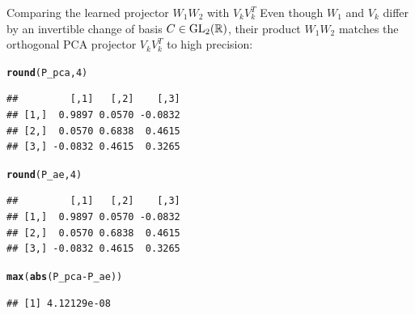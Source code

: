 \documentclass[aspectratio=169]{beamer}\usepackage[]{graphicx}\usepackage[]{xcolor}
\makeatletter
\newcommand{\hlnum}[1]{\textcolor[rgb]{0.686,0.059,0.569}{#1}}%
\newcommand{\hlopt}[1]{\textcolor[rgb]{0,0,0}{#1}}%
\newcommand{\hldef}[1]{\textcolor[rgb]{0.345,0.345,0.345}{#1}}%
\newcommand{\hlkwd}[1]{\textcolor[rgb]{0.737,0.353,0.396}{\textbf{#1}}}%
\newenvironment{kframe}{%
 \def\at@end@of@kframe{}%
 \ifinner\ifhmode%
  \def\at@end@of@kframe{\end{minipage}}%
  \begin{minipage}{\columnwidth}%
 \fi\fi%
 \def\FrameCommand##1{\hskip\@totalleftmargin \hskip-\fboxsep
 \colorbox{shadecolor}{##1}\hskip-\fboxsep
     \hskip-\linewidth \hskip-\@totalleftmargin \hskip\columnwidth}%
 \MakeFramed {\advance\hsize-\width
   \@totalleftmargin\z@ \linewidth\hsize
   \@setminipage}}%
 {\par\unskip\endMakeFramed%
 \at@end@of@kframe}
\newenvironment{knitrout}{}{} %
\makeatother
\begin{document}
\begin{frame}[fragile]{Comparing the learned projector $W_1 W_2$ with $V_k V_k^T$}
Even though $W_1$ and $V_k$ differ by an invertible change of basis $C \in \operatorname{GL}_2(\mathbb{R})$, their product $W_1 W_2$ matches the orthogonal PCA projector $V_k V_k^T$ to high precision:
\begin{knitrout}
\color{fgcolor}\begin{kframe}
\begin{alltt}
\hlkwd{round}\hldef{(P_pca,} \hlnum{4}\hldef{)}
\end{alltt}
\begin{verbatim}
##         [,1]   [,2]    [,3]
## [1,]  0.9897 0.0570 -0.0832
## [2,]  0.0570 0.6838  0.4615
## [3,] -0.0832 0.4615  0.3265
\end{verbatim}
\begin{alltt}
\hlkwd{round}\hldef{(P_ae,} \hlnum{4}\hldef{)}
\end{alltt}
\begin{verbatim}
##         [,1]   [,2]    [,3]
## [1,]  0.9897 0.0570 -0.0832
## [2,]  0.0570 0.6838  0.4615
## [3,] -0.0832 0.4615  0.3265
\end{verbatim}
\begin{alltt}
\hlkwd{max}\hldef{(}\hlkwd{abs}\hldef{(P_pca} \hlopt{-} \hldef{P_ae))}
\end{alltt}
\begin{verbatim}
## [1] 4.12129e-08
\end{verbatim}
\end{kframe}
\end{knitrout}
\end{frame}







\end{document}
